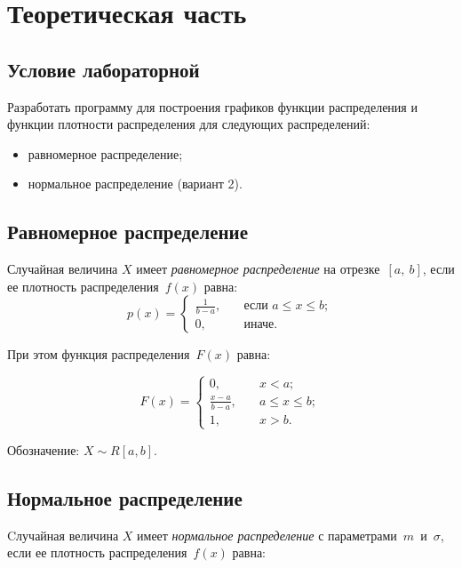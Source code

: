 \chapter{Теоретическая часть}


\section{Условие лабораторной}

Разработать программу для построения графиков функции распределения и функции плотности распределения для следующих распределений: 
\begin{itemize}
	\item равномерное распределение;
	\item нормальное распределение (вариант 2).
\end{itemize} 

\section{Равномерное распределение}

Случайная величина $X$ имеет \textit{равномерное распределение} на отрезке~$[a,~b]$, если ее плотность распределения~$f(x)$ равна:
\begin{equation}
	p(x) =
	\begin{cases}
		\displaystyle\frac{1}{b - a}, & \quad \text{если } a \leq x \leq b;\\
		0,  & \quad \text{иначе}.
	\end{cases}
\end{equation}

При этом функция распределения~$F(x)$ равна:

\begin{equation}
	F(x) =
	\begin{cases}
		0,  & \quad x < a;\\
		\displaystyle\frac{x - a}{b - a}, & \quad a \leq x \leq b;\\
		1,  & \quad x > b.
	\end{cases}
\end{equation}

Обозначение: $X \sim R[a, b]$.

\clearpage

\section{Нормальное распределение}

Cлучайная величина $X$ имеет \textit{нормальное распределение} с
параметрами~$m$~и~$\sigma$, если ее плотность распределения~$f(x)$ равна:

